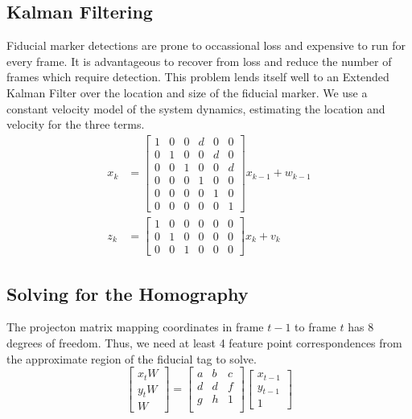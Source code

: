 \documentclass[letterpaper,10pt,conference]{IEEEtran}
\begin{document}
\subsection{Kalman Filtering}
Fiducial marker detections are prone to occassional loss and expensive to run for every frame.  It is advantageous to recover from loss and reduce the number of frames which require detection.  This problem lends itself well to an Extended Kalman Filter over the location and size of the fiducial marker.  We use a constant velocity model of the system dynamics, estimating the location and velocity for the three terms.  
\begin{align}
x_k &= \left[ \begin{array}{cccccc} 
1 & 0 & 0 & d & 0 & 0 \\
0 & 1 & 0 & 0 & d & 0 \\
0 & 0 & 1 & 0 & 0 & d \\
0 & 0 & 0 & 1 & 0 & 0\\
0 & 0 & 0 & 0 & 1 & 0\\
0 & 0 & 0 & 0 & 0 & 1
\end{array}\right] x_{k-1} + w_{k-1}\\
z_k &= \left[ \begin{array}{cccccc}
1 & 0 & 0 & 0 & 0 & 0\\
0 & 1 & 0 & 0 & 0 & 0\\
0 & 0 & 1 & 0 & 0 & 0\end{array}\right] x_k + v_{k}
\end{align}


\subsection{Solving for the Homography}
The projecton matrix mapping coordinates in frame $t-1$ to frame $t$ has 8 degrees of freedom. Thus, we need at least 4 feature point correspondences from the approximate region of the fiducial tag to solve. 
\begin{equation}
\begin{bmatrix}
x_{t}W\\
y_{t}W\\
W
\end{bmatrix}
= \begin{bmatrix}
a&b&c\\
d&d&f\\
g&h&1\\
\end{bmatrix}
\begin{bmatrix}
x_{t-1}\\
y_{t-1}\\
1
\end{bmatrix}
\end{equation}
\end{document}
